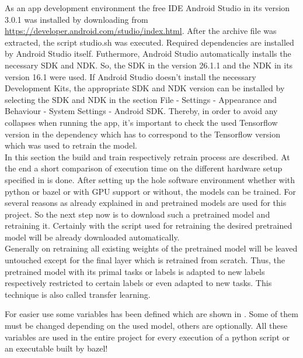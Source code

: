 As an app development environment the free IDE Android Studio in its version 3.0.1 was installed by downloading from \url{https://developer.android.com/studio/index.html}. After the archive file was extracted, the script studio.sh was executed. Required dependencies are installed by Android Studio itself. Futhermore, Android Studio automatically installs the necessary SDK and NDK. So, the SDK in the version 26.1.1 and the NDK in its version 16.1 were used. If Android Studio doesn't install the necessary Development Kits, the appropriate SDK and NDK version can be installed by selecting the SDK and NDK in the section File - Settings - Appearance and Behaviour - System Settings - Android SDK. Thereby, in order to avoid any collapses when running the app, it's important to check the used Tensorflow version in the dependency which has to correspond to the Tensorflow version which was used to retrain the model.\\





In this section the build and train respectively retrain process are described. At the end a short comparison of execution time on the different hardware setup specified in  is done.
After setting up the hole software environment whether with python or bazel or with GPU support or without, the models can be trained. For several reasons as already explained in  and  pretrained models are used for this project. So the next step now is to download such a pretrained model and retraining it. Certainly with the script used for retraining the desired pretrained model will be already downloaded automatically. \\

Generally on retraining all existing weights of the pretrained model will be leaved untouched except for the final layer which is retrained from scratch. Thus, the pretrained model with its primal tasks or labels is adapted to new labels respectively restricted to certain labels or even adapted to new tasks. This technique is also called transfer learning. \citep{TensorFlowRetrain2017}

For easier use some variables has been defined which are shown in . Some of them must be changed depending on the used model, others are optionally. All these variables are used in the entire project for every execution of a python script or an executable built by bazel!

